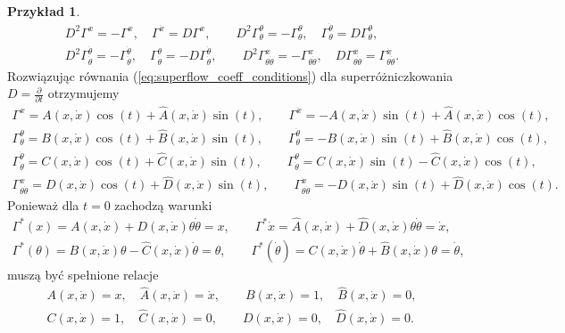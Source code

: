 \documentclass[11pt,a4paper]{report}
\theoremstyle{definition}
\newtheorem{example}[theorem]{Przykład}
\begin{document}
\begin{example}
\begin{equation}
\begin{gathered}
			D^2\Gamma^x=-\Gamma^x,\quad \Gamma^{\dot x}=D\Gamma^x,\qquad
			D^2\Gamma^\theta_{\theta}=-\Gamma^\theta_{\theta},\quad \Gamma^{\dot\theta}_{\theta}=D\Gamma^{\theta}_{\theta},\\
			D^2\Gamma^{\dot\theta}_{\dot \theta}=-\Gamma^{\dot\theta}_{\dot\theta},\quad \Gamma^{\theta}_{\dot\theta}=-D\Gamma^{\dot\theta}_{\dot\theta},\qquad
			D^2\Gamma^x_{\theta\dot\theta}=-\Gamma^x_{\theta\dot \theta},\quad D\Gamma^{x}_{\theta\dot\theta}=\Gamma^{\dot x}_{\theta\dot\theta}.
		\end{gathered}
	\end{equation}
	Rozwiązując równania (\ref{eq:superflow_coeff_conditions}) dla superróżniczkowania $D = \frac{\partial}{\partial t}$ otrzymujemy
	\begin{equation}
		\begin{gathered}
			\Gamma^x =A(x,\dot x)\cos (t)+\hat A(x,\dot x)\sin(t),\qquad  \Gamma^{\dot x}=-A(x,\dot x)\sin (t)+\hat A(x,\dot x)\cos(t),\\
			\Gamma^\theta_\theta =B(x,\dot x)\cos (t)+\hat B(x,\dot x)\sin(t),\qquad \Gamma^{\dot \theta}_\theta=-B(x,\dot x)\sin (t)+\hat B(x,\dot x)\cos(t),\\
			\Gamma^{\dot \theta}_{\dot \theta} =C(x,\dot x)\cos (t)+\hat C(x,\dot x)\sin(t),\qquad \Gamma^{\theta}_{\dot \theta}=C(x,\dot x)\sin (t)-\hat C(x,\dot x)\cos(t),\\
			\Gamma^x_{\theta\dot\theta} =D(x,\dot x)\cos (t)+\hat D(x,\dot x)\sin(t),\qquad  \Gamma^{\dot x}_{\theta\dot\theta}=-D(x,\dot x)\sin (t)+\hat D(x,\dot x)\cos(t).
		\end{gathered}
	\end{equation}
	Ponieważ dla $t=0$ zachodzą warunki
	\begin{equation*}
		\begin{gathered}
			\Gamma^*(x)=A(x,\dot x)+D(x,\dot x)\theta\dot\theta=x,\qquad\Gamma^*\dot x=\hat A(x,\dot x)+\hat D(x,\dot x)\theta\dot\theta=\dot x,\quad\\
			\Gamma^*(\theta)=B(x,\dot x)\theta-\hat C(x,\dot x)\dot\theta=\theta,\qquad
			\Gamma^*(\dot \theta)=C(x,\dot x)\dot\theta+\hat B(x,\dot x)\theta=\dot\theta,
		\end{gathered}
	\end{equation*}
	muszą być spełnione relacje
	\begin{equation*}
		\begin{gathered}
			A(x,\dot x)=x,\quad \hat A(x,\dot x)=\dot x, \qquad B(x,\dot x)=1, \quad \hat B(x,\dot x)=0, \\ C(x,\dot x)=1, \quad \hat C(x,\dot x)=0, \qquad D(x,\dot x)=0, \quad \hat D(x,\dot x)=0.

\end{gathered}
\end{equation*}
\end{example}
\end{document}

